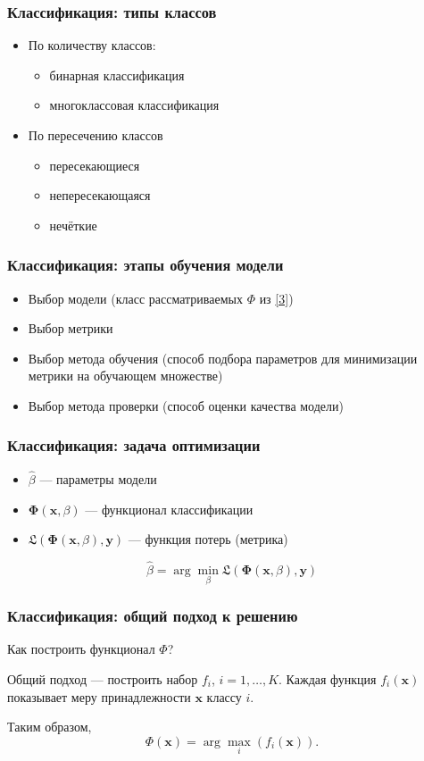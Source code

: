 \documentclass[11pt]{beamer}
\begin{document}
	\begin{frame}
		\frametitle{Классификация: типы классов}
		\begin{itemize}
			\item По количеству классов:
			\begin{itemize}
				\item бинарная классификация
				\item многоклассовая классификация
			\end{itemize}
			\item По пересечению классов 
			\begin{itemize}
				\item пересекающиеся
				\item непересекающаяся
				\item нечёткие
			\end{itemize}
		\end{itemize}
	\end{frame}
	\begin{frame}
		\frametitle{Классификация: этапы обучения модели}
		\begin{itemize}
			\item Выбор модели (класс рассматриваемых $\Phi$ из \ref{3})
			\item Выбор метрики
			\item Выбор метода обучения (способ подбора параметров для минимизации метрики на обучающем множестве)
			\item Выбор метода проверки (способ оценки качества модели)
		\end{itemize}
	\end{frame}
	\begin{frame}
		\frametitle{Классификация: задача оптимизации}
		\begin{itemize}
			\item $\hat{\beta}$ --- параметры модели
			\item $\bm{\Phi}(\bm{x}, \beta)$ --- функционал классификации
			\item $\mathfrak{L}(\bm{\Phi}(\bm{x}, \beta), \bm{y})$ --- функция потерь (метрика)
		\end{itemize}
		\begin{block}{}
			$$\hat{\beta} = \arg\min_{\beta} \mathfrak{L}(\bm{\Phi}(\bm{x}, \beta), \bm{y})$$
		\end{block}
	
	\end{frame}
	\begin{frame}
		\frametitle{Классификация: общий подход к решению}
		Как построить функционал $\Phi$?
		
		
		Общий подход --- построить набор $f_i$, $i = 1, \ldots, K$. Каждая функция $f_i(\bm{x})$ показывает меру принадлежности $\bm{x}$ классу $i$. 
		
		Таким образом,
		\begin{equation}
			\Phi(\bm{x}) = \arg\max_i(f_i(\bm{x})).
			\label{4}
		\end{equation}
	\end{frame}
\end{document}
